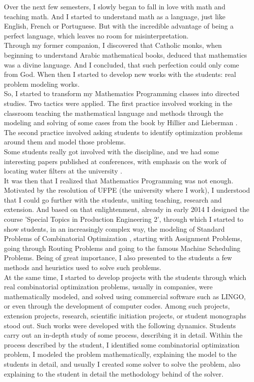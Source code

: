 \documentclass{book}
\begin{document}
Over the next few semesters, I slowly began to fall in love with math and teaching math. And I started to understand math as a language, just like English, French or Portuguese. But with the incredible advantage of being a perfect language, which leaves no room for misinterpretation. \\

Through my former companion, I discovered that Catholic monks, when beginning to understand Arabic mathematical books, deduced that mathematics was a divine language. And I concluded, that such perfection could only come from God. When then I started to develop new works with the students: real problem modeling works. \\

So, I started to transform my Mathematics Programming classes into directed studies. Two tactics were applied. The first practice involved working in the classroom teaching the mathematical language and methods through the modeling and solving of some cases from the book by Hillier and Lieberman \cite{HillierLieberman}. The second practice involved asking students to identify optimization problems around them and model those problems. \\

Some students really got involved with the discipline, and we had some interesting papers published at conferences, with emphasis on the work of locating water filters at the university \cite{AndradeAndFraga2016}. \\

It was then that I realized that Mathematics Programming was not enough. Motivated by the resolution of UFPE (the university where I work), I understood that I could go further with the students, uniting teaching, research and extension. And based on that enlightenment, already in early 2014 I designed the course 'Special Topics in Production Engineering 2', through which I started to show students, in an increasingly complex way, the modeling of Standard Problems of Combinatorial Optimization , starting with Assignment Problems, going through Routing Problems and going to the famous Machine Scheduling Problems. Being of great importance, I also presented to the students a few methods and heuristics used to solve such problems. \\

At the same time, I started to develop projects with the students through which real combinatorial optimization problems, usually in companies, were mathematically modeled, and solved using commercial software such as LINGO, or even through the development of computer codes. Among such projects, extension projects, research, scientific initiation projects, or student monographs stood out. Such works were developed with the following dynamics. Students carry out an in-depth study of some process, describing it in detail. Within the process described by the student, I identified some combinatorial optimization problem, I modeled the problem mathematically, explaining the model to the students in detail, and usually I created some solver to solve the problem, also explaining to the student in detail the methodology behind of the solver. \\
\end{document}
